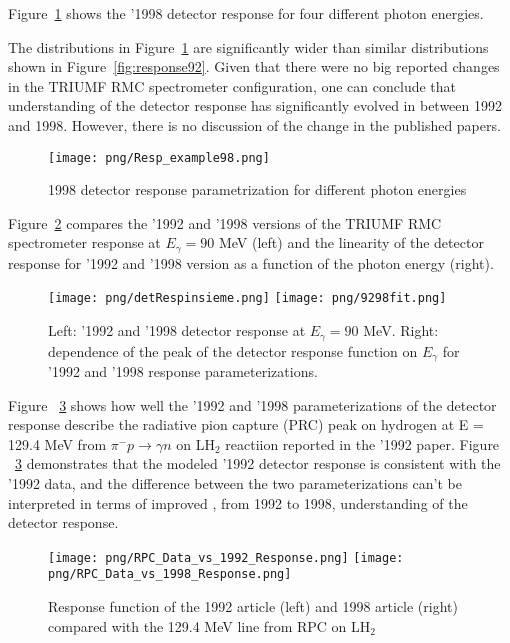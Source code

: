 Figure~\ref{fig:response98} shows the '1998 detector response for four different photon energies.

The distributions in Figure~\ref{fig:response98} are significantly wider than similar distributions
shown in Figure~\ref{fig:response92}. Given that there were no big reported changes in the TRIUMF
RMC spectrometer configuration, one can conclude that understanding of the detector response has
significantly evolved in between 1992 and 1998. However, there is no discussion of the change 
in the published papers. 

\begin{figure}[!h]
\centering
\texttt{[image: png/Resp\_example98.png]}
\caption{1998 detector response parametrization for different photon energies}
\label{fig:response98}
\end{figure}

Figure~\ref{fig:shapecomp} compares the '1992 and '1998 versions of the
TRIUMF RMC spectrometer response at $E_{\gamma}=90$ MeV (left) and 
the linearity of the detector response for '1992 and '1998 version
as a function of the photon energy (right).

\begin{figure} [!h]
\centering
\texttt{[image: png/detRespinsieme.png]}
\texttt{[image: png/9298fit.png]}
\caption{
  Left: '1992 and '1998 detector response at $E_{\gamma}=90$ MeV.
  Right: dependence of the peak of the detector response function on $E_{\gamma}$
  for '1992 and '1998 response parameterizations.
}
\label{fig:shapecomp} 
\end{figure}

Figure ~\ref{p004} shows how well the '1992 and '1998 parameterizations of the detector
response describe the radiative pion capture (PRC) peak on hydrogen at E = 129.4 MeV
from $\pi^{-}p \rightarrow \gamma n$ on LH$_{2}$ reactiion reported in the '1992 paper.
Figure ~\ref{p004} demonstrates that the modeled '1992 detector response is consistent
with the '1992 data, and the difference between the two parameterizations can't be
interpreted in terms of improved , from 1992 to 1998, understanding of the detector
response.\\

  \begin{figure}[!h]
 \begin{center}
 \texttt{[image: png/RPC\_Data\_vs\_1992\_Response.png]} 
 \texttt{[image: png/RPC\_Data\_vs\_1998\_Response.png]} 
 \end{center}
 \caption{Response function of the 1992 article (left) and 1998 article (right) compared with the 129.4 MeV line from RPC on LH$_{2}$}
 \label{p004}
 \end{figure}

